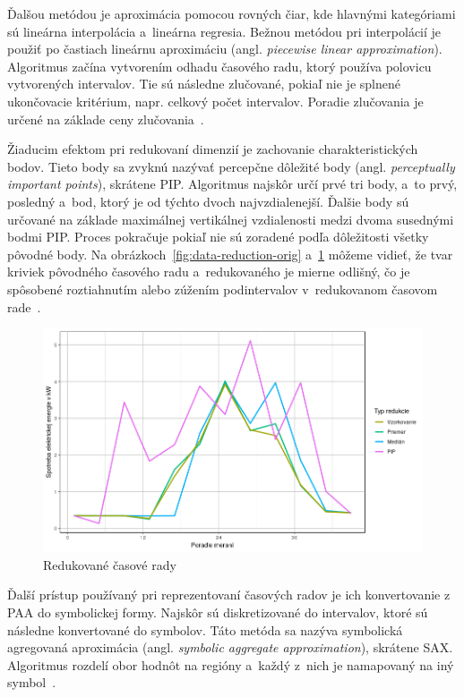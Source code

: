 \documentclass[a4paper,twoside,slovak,12pt,appendix]{article}
\begin{document}
Ďalšou metódou je aproximácia pomocou rovných čiar, kde hlavnými kategóriami sú
lineárna interpolácia a~lineárna regresia. Bežnou metódou pri interpolácií je
použiť po častiach lineárnu aproximáciu (angl. \textit{piecewise linear
approximation}). Algoritmus začína vytvorením odhadu časového radu, ktorý
používa polovicu vytvorených intervalov. Tie sú následne zlučované, pokiaľ nie
je splnené ukončovacie kritérium, napr. celkový počet intervalov. Poradie
zlučovania je určené na základe ceny zlučovania~\cite{Fu2011}.

Žiaducim efektom pri redukovaní dimenzií je zachovanie charakteristických bodov.
Tieto body sa zvyknú nazývať percepčne dôležité body (angl. \textit{perceptually
important points}), skrátene PIP. Algoritmus najskôr určí prvé tri body, a~to
prvý, posledný a~bod, ktorý je od týchto dvoch najvzdialenejší. Ďalšie body sú
určované na základe maximálnej vertikálnej vzdialenosti medzi dvoma susednými
bodmi PIP. Proces pokračuje pokiaľ nie sú zoradené podľa dôležitosti všetky
pôvodné body. Na obrázkoch~\ref{fig:data-reduction-orig}
a~\ref{fig:data-reduction-agg} môžeme vidieť, že tvar kriviek pôvodného časového
radu a~redukovaného je mierne odlišný, čo je spôsobené roztiahnutím alebo
zúžením podintervalov v~redukovanom časovom rade~\cite{Fu2011}.

\begin{figure}[htbp]
  \centering
  \includegraphics[width=\textwidth]{data_reduction_agg.png}
  \caption{Redukované časové rady}
  \label{fig:data-reduction-agg}
\end{figure}

Ďalší prístup používaný pri reprezentovaní časových radov je ich konvertovanie
z PAA do symbolickej formy. Najskôr sú diskretizované do intervalov, ktoré sú
následne konvertované do symbolov. Táto metóda sa nazýva symbolická agregovaná
aproximácia (angl. \textit{symbolic aggregate approximation}), skrátene SAX.
Algoritmus rozdelí obor hodnôt na regióny a~každý z~nich je namapovaný na iný
symbol~\cite{Fu2011}.
\end{document}
